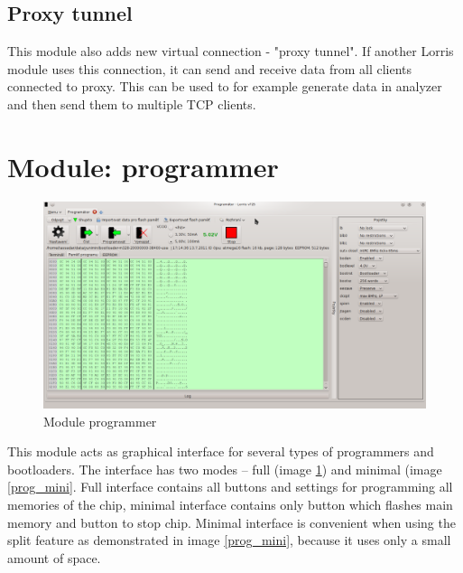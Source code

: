 \documentclass[12pt, a4paper, oneside]{article}
\begin{document}
\subsection{Proxy tunnel}
This module also adds new virtual connection - "proxy tunnel". If another Lorris module uses this connection, it can send and receive data from all clients connected to proxy. This can be used to for example generate data in analyzer and then send them to multiple TCP clients.

\newpage
\setlength{\voffset}{0mm} %
\pagestyle{plain}

\section{Module: programmer}
\begin{figure}[H]
\begin{center}
\includegraphics[width=\textwidth]{img/programmer.png}
\caption{Module programmer}
\label{prog_full}
\end{center}
\end{figure}

This module acts as graphical interface for several types of programmers and bootloaders. The interface has two modes -- full (image \ref{prog_full}) and minimal (image \ref{prog_mini}. Full interface contains all buttons and settings for programming all memories of the chip, minimal interface contains only button which flashes main memory and button to stop chip. Minimal interface is convenient when using the split feature as demonstrated in image \ref{prog_mini}, because it uses only a small amount of space.
\end{document}
